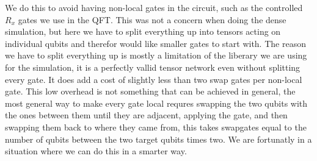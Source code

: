 \noindent
We do this to avoid having non-local gates in the circuit, such as the controlled $R_x$ gates we use in the QFT. This was not a concern when doing the dense simulation, but here we have to split everything up into tensors acting on individual qubits and therefor would like smaller gates to start with. The reason we have to split everything up is mostly a limitation of the liberary we are using for the simulation, it is a perfectly vallid tensor network even without splitting every gate. It does add a cost of slightly less than two swap gates per non-local gate. 
This low overhead is not something that can be achieved in general, the most general way to make every gate local requres swapping the two qubits with the ones between them until they are adjacent, applying the gate, and then swapping them back to where they came from, this takes swapgates equal to the number of qubits between the two target qubits times two. We are fortunatly in a situation where we can do this in a smarter way. 
